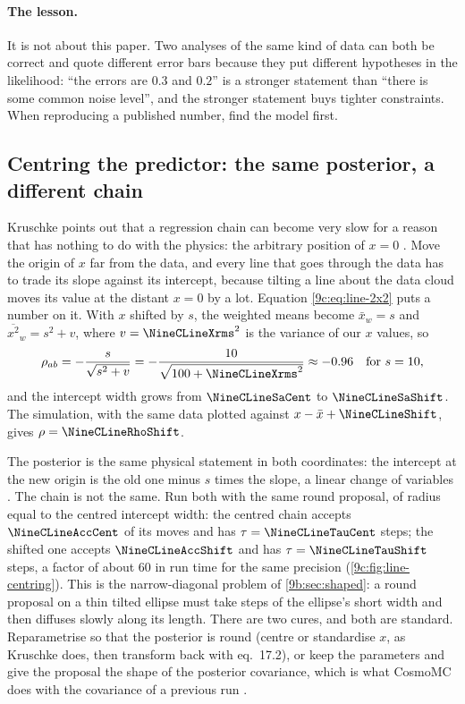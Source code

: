\paragraph{The lesson.} It is not about this paper. Two analyses of the same kind of data can both be correct and
quote different error bars because they put different hypotheses in the likelihood: ``the errors
are $0.3$ and $0.2$'' is a stronger statement than ``there is some common noise level'', and the
stronger statement buys tighter constraints. When reproducing a published number, find the model
first.

\subsection{Centring the predictor: the same posterior, a different chain}
\label{9c:sec:line-centre}

Kruschke points out that a regression chain can become very slow for a reason that has nothing to
do with the physics: the arbitrary position of $x=0$ . Move the origin
of $x$ far from the data, and every line that goes through the data has to trade its slope against
its intercept, because tilting a line about the data cloud moves its value at the distant
$x=0$ by a lot. Equation \eqref{9c:eq:line-2x2} puts a number on it. With $x$ shifted by $s$, the
weighted means become $\bar x_w=s$ and $\overline{x^2}_w=s^2+v$, where $v=\NineCLineXrms^2$ is the
variance of our $x$ values, so
\[
  \rho_{ab}=-\frac{s}{\sqrt{s^2+v}}=-\frac{10}{\sqrt{100+\NineCLineXrms^2}}\approx-0.96
  \quad\text{for } s=10,
\]
and the intercept width grows from $\NineCLineSaCent$ to $\NineCLineSaShift$. The simulation, with
the same data plotted against $x-\bar x+\NineCLineShift$, gives $\rho=\NineCLineRhoShift$.

The posterior is the same physical statement in both coordinates: the intercept at the new origin
is the old one minus $s$ times the slope, a linear change of variables
. The chain is not the same. Run both with the same round proposal, of
radius equal to the centred intercept width: the centred chain accepts $\NineCLineAccCent$ of its
moves and has $\tau=\NineCLineTauCent$ steps; the shifted one accepts $\NineCLineAccShift$ and has
$\tau=\NineCLineTauShift$ steps, a factor of about 60 in run time for the same precision
(\cref{9c:fig:line-centring}). This is the narrow-diagonal problem of \cref{9b:sec:shaped}: a round
proposal on a thin tilted ellipse must take steps of the ellipse's short width and then diffuses
slowly along its length. There are two cures, and both are standard. Reparametrise so that the
posterior is round (centre or standardise $x$, as Kruschke does, then transform back with eq.~17.2),
or keep the parameters and give the proposal the shape of the posterior covariance, which is what
CosmoMC does with the covariance of a previous run \cite{LewisBridle2002}.


